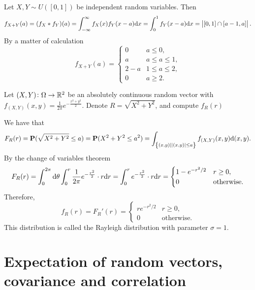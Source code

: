 \documentclass[11pt,a4paper]{article}
\begin{document}
\begin{example}
  Let $X,Y \sim U([0,1])$ be independent random variables.
  Then
  \[
    f_{X+Y}(a) =
    (f_{X} * f_{Y})(a) =
    \int_{-\infty}^{\infty} f_X(x) f_Y(x - a) \dx =
    \int_{0}^{1} f_Y(x - a) \dx =
    \abs{[0,1] \cap [a-1,a]}.
  \]
  By a matter of calculation
  \[
    f_{X+Y}(a) =
    \begin{cases}
      0 & a \le 0, \\
      a & a \le a \le 1, \\
      2 - a & 1 \le a \le 2, \\
      0 & a \geq 2.
    \end{cases}
  \]
\end{example}

\begin{exercise}
  Let $(X,Y) \colon \Omega \to \mathbb{R}^2$
  be an absolutely continuous random vector with
  $f_{(X,Y)}(x,y) = \frac{1}{2\pi} e^{-\frac{x^2 + y^2}{2}}$.
  Denote $R = \sqrt{X^2 + Y^2}$,
  and compute $f_R(r)$
\end{exercise}
\begin{solution}
  We have that
  \[
    F_R(r) =
    \mathbf{P}(\sqrt{X^2 + Y^2} \le a) =
    \mathbf{P}(X^2 + Y^2 \le a^2) =
    \int_{\left\{(x,y) \mid |(x,y)| \le a\right\}} f_{(X,Y)}(x,y) \mathrm{d}(x,y).
  \]
  By the change of variables theorem
  \[
    F_R(r) =
    \int_{0}^{2\pi} \mathrm{d} \theta \int_{0}^{r}
    \frac{1}{2\pi} e^{-\frac{r^2}{2}} \cdot r \mathrm{d} r =
    \int_{0}^{r} e^{-\frac{r^2}{2}} \cdot r \mathrm{d} r =
    \begin{cases}
      1 - e^{-r^2/2} & r \geq 0, \\
      0 &\text{otherwise}.
    \end{cases}
  \]
  Therefore,
  \[
    f_R(r) =
    F_R'(r) =
    \begin{cases}
      r e^{-r^2/2} & r \geq 0, \\
      0 &\text{otherwise}.
    \end{cases}
  \]
  This distribution is called the Rayleigh distribution
  with parameter $\sigma = 1$.
\end{solution}

\newpage

\section{Expectation of random vectors, covariance and correlation}
\end{document}

